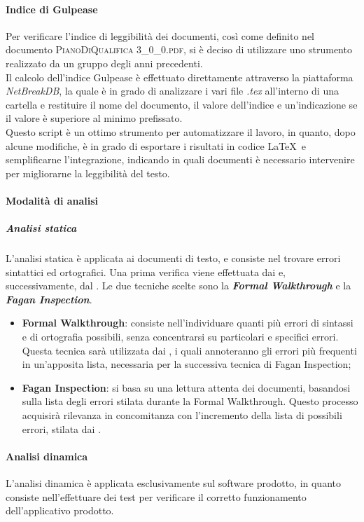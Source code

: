 		\paragraph{Indice di Gulpease}
		Per verificare l'indice di leggibilità dei documenti, così come definito nel documento \textsc{PianoDiQualifica 3\_0\_0.pdf}, si è deciso di utilizzare uno strumento realizzato da un gruppo degli anni precedenti.\\
		Il calcolo dell'indice Gulpease è effettuato direttamente attraverso la piattaforma \textit{NetBreakDB}, la quale è in grado di analizzare i vari file \textit{.tex} all'interno di una cartella e restituire il nome del documento, il valore dell'indice e un'indicazione se il valore è superiore al minimo prefissato.\\
		Questo script è un ottimo strumento per automatizzare il lavoro, in quanto, dopo alcune modifiche, è in grado di esportare i risultati in codice \LaTeX\ e semplificarne l'integrazione, indicando in quali documenti è necessario intervenire per migliorarne la leggibilità del testo.
		
		\paragraph{Modalità di analisi}
			\subparagraph{Analisi statica}
			L'analisi statica è applicata ai documenti di testo, e consiste nel trovare errori sintattici ed ortografici. Una prima verifica viene effettuata dai \textit{\Vers} e, successivamente, dal \textit{\RdP}. Le due tecniche scelte sono la \textbf{\textit{Formal Walkthrough}} e la \textbf{\textit{Fagan Inspection}}.
			\begin{itemize}
				\item \textbf{Formal Walkthrough}: consiste nell'individuare quanti più errori di sintassi e di ortografia possibili, senza concentrarsi su particolari e specifici errori. Questa tecnica sarà utilizzata dai \textit{\Vers}, i quali annoteranno gli errori più frequenti in un'apposita lista, necessaria per la successiva tecnica di Fagan Inspection;
				\item \textbf{Fagan Inspection}: si basa su una lettura attenta dei documenti, basandosi sulla lista degli errori stilata durante la Formal Walkthrough. Questo processo acquisirà rilevanza in concomitanza con l'incremento della lista di possibili errori, stilata dai \textit{\Vers}.
			\end{itemize}

			\paragraph{Analisi dinamica}
			L'analisi dinamica è applicata esclusivamente sul software prodotto, in quanto consiste nell'effettuare dei test per verificare il corretto funzionamento dell'applicativo prodotto.
	
